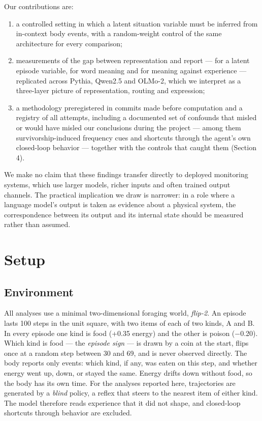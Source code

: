 \documentclass[11pt]{article}
\begin{document}
Our contributions are:
\begin{enumerate}
\item a controlled setting in which a latent situation variable must be inferred from in-context body events, with a random-weight control of the same architecture for every comparison;
\item measurements of the gap between representation and report --- for a latent episode variable, for word meaning and for meaning against experience --- replicated across Pythia, Qwen2.5 and OLMo-2, which we interpret as a three-layer picture of representation, routing and expression;
\item a methodology preregistered in commits made before computation and a registry of all attempts, including a documented set of confounds that misled or would have misled our conclusions during the project --- among them survivorship-induced frequency cues and shortcuts through the agent's own closed-loop behavior --- together with the controls that caught them (Section 4).
\end{enumerate}

We make no claim that these findings transfer directly to deployed monitoring systems, which use larger models, richer inputs and often trained output channels. The practical implication we draw is narrower: in a role where a language model's output is taken as evidence about a physical system, the correspondence between its output and its internal state should be measured rather than assumed.


\section{Setup}

\subsection{Environment}

All analyses use a minimal two-dimensional foraging world, \emph{flip-2}. An episode lasts 100 steps in the unit square, with two items of each of two kinds, A and B. In every episode one kind is food (+0.35 energy) and the other is poison ($-$0.20). Which kind is food --- the \emph{episode sign} --- is drawn by a coin at the start, flips once at a random step between 30 and 69, and is never observed directly. The body reports only events: which kind, if any, was eaten on this step, and whether energy went up, down, or stayed the same. Energy drifts down without food, so the body has its own time. For the analyses reported here, trajectories are generated by a \emph{blind} policy, a reflex that steers to the nearest item of either kind. The model therefore reads experience that it did not shape, and closed-loop shortcuts through behavior are excluded.
\end{document}
